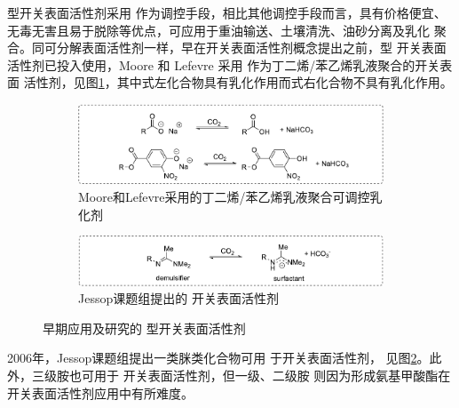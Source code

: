 \documentclass[bachelor,winfonts,replaceperiod]{jnuthesis}
\begin{document}
    型开关表面活性剂采用 作为调控手段，相比其他调控手段而言，具有价格便宜、
    无毒无害且易于脱除等优点\cite{jessop2012}，可应用于重油输送、土壤清洗、油砂分离及乳化
    聚合\cite{jessop2012}。同可分解表面活性剂一样，早在开关表面活性剂概念提出之前，型
    开关表面活性剂已投入使用，Moore 和 Lefevre 采用 作为丁二烯/苯乙烯乳液聚合的开关表面
    活性剂，见图\ref{fig:switchable-co2-a}，其中式左化合物具有乳化作用而式右化合物不具有乳化作用。
    \begin{figure}
    \centering
        \begin{subfigure}[b]{\textwidth}
            \centering
            \includegraphics[scale=0.8]{Figure/switchable-co2-a.pdf}
            \caption{Moore和Lefevre采用的丁二烯/苯乙烯乳液聚合可调控乳化剂}\label{fig:switchable-co2-a}
        \end{subfigure}%
    
        \begin{subfigure}[b]{\textwidth}
            \centering
            \includegraphics[scale=0.8]{Figure/switchable-co2-b.pdf}
            \caption{Jessop课题组提出的 开关表面活性剂}\label{fig:switchable-co2-b}
        \end{subfigure}%
    \caption{早期应用及研究的 型开关表面活性剂}
    \label{fig:switchable-co2}
    \end{figure}
    
    2006年，Jessop课题组\cite{liu2006science}提出一类脒类化合物可用 于开关表面活性剂，
    见图\ref{fig:switchable-co2-b}。此外，三级胺也可用于 开关表面活性剂，但一级、二级胺
    则因为形成氨基甲酸酯在开关表面活性剂应用中有所难度\cite{jessop2012}。
    
\end{document}
